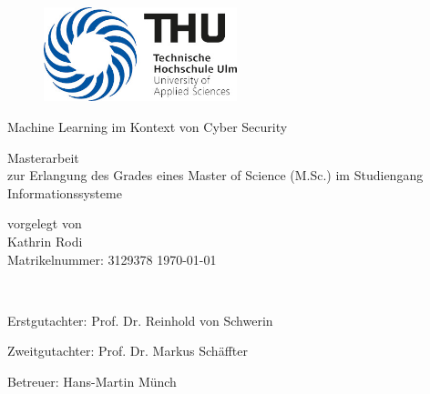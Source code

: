 \documentclass[
    12pt, %
    DIV10,
    ngerman, %
    a4paper, %
    oneside, %
    titlepage, %
    parskip=half, %
    headings=normal, %
    listof=totoc, %
    bibliography=totoc, %
    index=totoc, %
    captions=tableheading, %
    final %
]{scrreprt}
\begin{document}
\setcounter{secnumdepth}{3}
\setcounter{tocdepth}{3}
\ofoot{}
\begin{titlepage} 
	\newcommand{\HRule}{\rule{\linewidth}{1.5mm}} 
	\center
	\begin{figure}
	\centering
	\includegraphics[width=0.5\textwidth]{img/logo}
	\label{pic:Logo}
	\end{figure}
	
	 
	
	\begin{center}
	\end{center}

		{\huge Machine Learning im Kontext von Cyber Security}\\[0.4cm]
\begin{center}
\end{center}
		{\Large Masterarbeit}\\ 
		{zur Erlangung des Grades eines Master of Science (M.Sc.) im Studiengang Informationssysteme}
\vfill
\begin{center}
		{vorgelegt von}\ \\
\vspace{0.25\baselineskip}
		{\Large Kathrin Rodi}\ \\
\vfill
\vspace{0.25\baselineskip}
		{\Large Matrikelnummer: 3129378}
		\vfill			
{\Large \today} 
\end{center}	
\\[\baselineskip]
\vfill	
\begin{center}
{\large Erstgutachter: Prof. Dr. Reinhold von Schwerin}\\	
\end{center}
\begin{center}
{\large Zweitgutachter: Prof. Dr. Markus Schäffter}
\end{center}
\begin{center}
{\large Betreuer: Hans-Martin Münch}
\end{center}
	
\end{titlepage}
\end{document}
